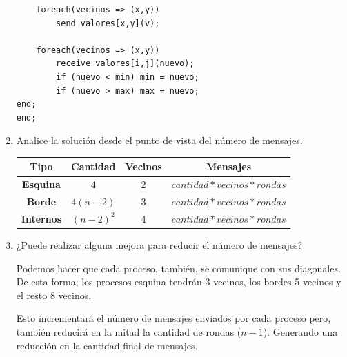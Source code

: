 \documentclass[a4paper, 10pt]{article}
\newenvironment{QandA}{
    \begin{enumerate}\bfseries}
    {\end{enumerate}
}
\newenvironment{answered}{\par\normalfont}{}
\begin{document}
\begin{QandA}
\begin{enumerate}
\begin{lstlisting}
    foreach(vecinos => (x,y))
        send valores[x,y](v);

    foreach(vecinos => (x,y))
        receive valores[i,j](nuevo);
        if (nuevo < min) min = nuevo;
        if (nuevo > max) max = nuevo;
end;
end;
\end{lstlisting}


\item Analice la solución desde el punto de vista del número de mensajes.
\begin{answered}

{\renewcommand{\arraystretch}{2}%
\begin{center}
\begin{tabular}{c c c c}
\textbf{Tipo} &  \textbf{Cantidad} & \textbf{Vecinos} & \textbf{Mensajes} \\
\hline
\textbf{Esquina} & 4 & 2 & $cantidad * vecinos * rondas$ \\
\hline
\textbf{Borde} & $4(n-2)$ & 3 & $cantidad * vecinos * rondas$ \\
\hline
\textbf{Internos} & $(n-2)^2$ & 4 & $cantidad * vecinos * rondas$\\
\end{tabular}
\end{center}}
\end{answered}

\item ¿Puede realizar alguna mejora para reducir el número de mensajes?
\begin{answered}
Podemos hacer que cada proceso, también, se comunique con sus diagonales. De esta forma; los procesos esquina tendrán 3 vecinos, los bordes 5 vecinos y el resto 8 vecinos.

Esto incrementará el número de mensajes enviados por cada proceso pero, también reducirá en la mitad la cantidad de rondas ($n-1$). Generando una reducción en la cantidad final de mensajes.


\end{answered}
\end{enumerate}
\end{QandA}
\end{document}
